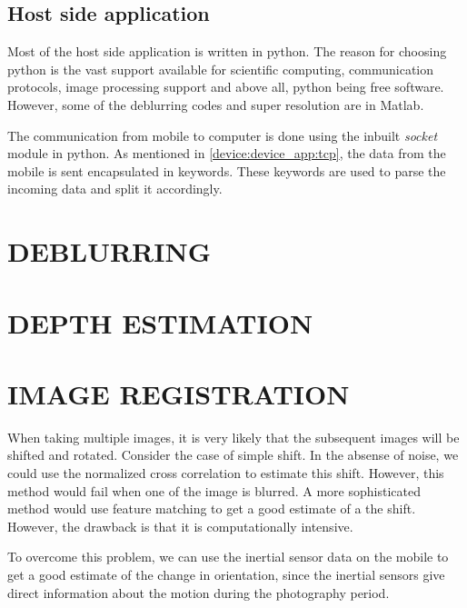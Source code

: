\documentclass[BTech]{iitmdiss}
\begin{document}
\section{Host side application}
\label{device:host}
Most of the host side application is written in python. The reason for 
choosing python is the vast support available for scientific computing,
communication protocols, image processing support and above all, python
being free software. However, some of the deblurring codes and 
super resolution are in Matlab.

The communication from mobile to computer is done using the inbuilt
\emph{socket} module in python. As mentioned in 
\ref{device:device_app:tcp}, the data from the mobile is sent
encapsulated in keywords. These keywords are used to parse the incoming
data and split it accordingly. 

\pagebreak

\chapter{DEBLURRING}
\label{chap:deblurring}
\pagebreak

\chapter{DEPTH ESTIMATION}
\label{chap:depth_estimation}

\chapter{IMAGE REGISTRATION}
\label{chap:image_registration}
When taking multiple images, it is very likely that the subsequent 
images will be shifted and rotated. Consider the case of simple shift. 
In the absense of noise, we could use the normalized cross correlation
to estimate this shift. However, this method would fail when one of the 
image is blurred. A more sophisticated method would use feature matching
to get a good estimate of a the shift. However, the drawback is that it
is computationally intensive.

To overcome this problem, we can use the inertial sensor data on the 
mobile to get a good estimate of the change in orientation, since the 
inertial sensors give direct information about the motion during the 
photography period. 
\end{document}

